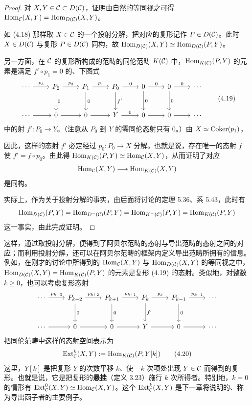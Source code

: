 \begin{proof}
对 $X,Y\in\mathcal{C}\subset D(\mathcal{C})$，证明由自然的等同视之可得 $\operatorname{Hom}_{\mathcal{C}}(X,Y)=\operatorname{Hom}_{D(\mathcal{C})}(X,Y)$。

如 (4.18) 那样取 $X\in\mathcal{C}$ 的一个投射分解，把对应的复形记作 $P\in D(\mathcal{C})$。此时 $X\in D(\mathcal{C})$ 与复形 $P\in D(\mathcal{C})$ 同构，故 $\operatorname{Hom}_{D(\mathcal{C})}(X,Y)\simeq\operatorname{Hom}_{D(\mathcal{C})}(P,Y)$。

另一方面，在 $\mathcal{C}$ 的复形所构成的范畴的同伦范畴 $K(\mathcal{C})$ 中，$\operatorname{Hom}_{K(\mathcal{C})}(P,Y)$ 的元素是满足 $f'\circ p_1=0$ 的、下图式
\begin{equation}
\begin{tikzcd}[row sep=2.6em, column sep=2.4em]
  \cdots \arrow[r,"p_3"] & P_2 \arrow[r,"p_2"] \arrow[d,"0"] & P_1 \arrow[r,"p_1"] \arrow[d,"0"] & P_0 \arrow[r,"0"] \arrow[d,"f'"] & 0 \arrow[r,"0"] \arrow[d,"0"] & 0 \arrow[r,"0"] \arrow[d,"0"] & \cdots \\
  \cdots \arrow[r] & 0 \arrow[r] & 0 \arrow[r] & Y \arrow[r,"0"] & 0 \arrow[r] & 0 \arrow[r] & \cdots
\end{tikzcd} \tag{4.19}
\end{equation}
中的射 $f'\colon P_0\to Y$。（注意从 $P_0$ 到 $Y$ 的零同伦态射只有 $0$。）由 $X\simeq\operatorname{Coker}(p_1)$，

因此，这样的态射 $f'$ 必定经过 $p_0\colon P_0\to X$ 分解。也就是说，存在唯一的态射 $f$ 使 $f'=f\circ p_0$。由此得 $\operatorname{Hom}_{K(\mathcal{C})}(P,Y)\simeq\operatorname{Hom}_{\mathcal{C}}(X,Y)$，从而证明了对应
\[ \operatorname{Hom}_{\mathcal{C}}(X,Y)\longrightarrow\operatorname{Hom}_{K(\mathcal{C})}(X,Y) \]
是同构。

实际上，作为关于投射分解的事实，由后面将讨论的定理 5.36、系 5.43，此时有
\[ \operatorname{Hom}_{D(\mathcal{C})}(P,Y)=\operatorname{Hom}_{D^-(\mathcal{C})}(P,Y)=\operatorname{Hom}_{K^-(\mathcal{C})}(P,Y)=\operatorname{Hom}_{K(\mathcal{C})}(P,Y) \]
这一事实，由此完成证明。
\end{proof}

这样，通过取投射分解，便得到了阿贝尔范畴的态射与导出范畴的态射之间的对应；而利用投射分解，还可以在阿贝尔范畴的框架内定义导出范畴所拥有的信息。例如，在刚才的讨论中所得到的 $\operatorname{Hom}_{\mathcal{C}}(X,Y)$ 与 $\operatorname{Hom}_{D(\mathcal{C})}(X,Y)$ 的等同视之中，$\operatorname{Hom}_{D(\mathcal{C})}(X,Y)=\operatorname{Hom}_{K(\mathcal{C})}(P,Y)$ 的元素是复形 (4.19) 的态射。类似地，对整数 $k\ge 0$，也可以考虑复形态射
\[\begin{tikzcd}[row sep=2.6em, column sep=2.4em]
  \cdots \arrow[r,"p_{k+3}"] & P_{k+2} \arrow[r,"p_{k+2}"] \arrow[d,"0"] & P_{k+1} \arrow[r,"p_{k+1}"] \arrow[d,"0"] & P_k \arrow[r,"p_k"] \arrow[d,"f'"] & P_{k-1} \arrow[r,"p_{k-1}"] \arrow[d,"0"] & \cdots \\
  \cdots \arrow[r] & 0 \arrow[r] & 0 \arrow[r] & Y \arrow[r] & 0 \arrow[r] & \cdots
\end{tikzcd}\]
把同伦范畴中这样的态射空间表示为
\begin{equation}
  \operatorname{Ext}^k_{\mathcal{C}}(X,Y):=\operatorname{Hom}_{K(\mathcal{C})}(P,Y[k]) \tag{4.20}
\end{equation}
这里，$Y[k]$ 是把复形 $Y$ 的次数平移 $k$、使 $-k$ 次项处出现 $Y\in\mathcal{C}$ 而得到的复形。也就是说，它是把复形的\textbf{悬挂}（定义 3.23）施行 $k$ 次所得者。特别地，$k=0$ 的情形有 $\operatorname{Ext}^0_{\mathcal{C}}(X,Y)\simeq\operatorname{Hom}_{\mathcal{C}}(X,Y)$。这个 $\operatorname{Ext}^k_{\mathcal{C}}(X,Y)$ 是下一章将说明的、称为导出函子者的主要例子。

